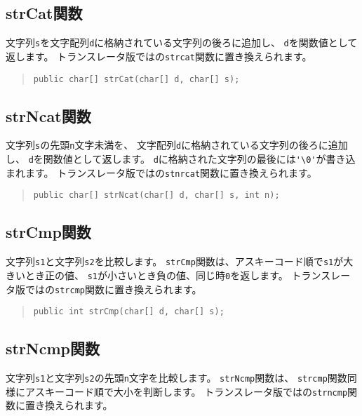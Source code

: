 \subsection{strCat関数}

文字列\verb/s/を文字配列\verb/d/に格納されている文字列の後ろに追加し、
\verb/d/を関数値として返します。
トランスレータ版では\cl の\verb/strcat/関数に置き換えられます。

\begin{quote}
\begin{verbatim}
public char[] strCat(char[] d, char[] s);
\end{verbatim}
\end{quote}

\subsection{strNcat関数}

文字列\verb/s/の先頭\verb/n/文字未満を、
文字配列\verb/d/に格納されている文字列の後ろに追加し、
\verb/d/を関数値として返します。
\verb/d/に格納された文字列の最後には\verb/'\0'/が書き込まれます。
トランスレータ版では\cl の\verb/stnrcat/関数に置き換えられます。

\begin{quote}
\begin{verbatim}
public char[] strNcat(char[] d, char[] s, int n);
\end{verbatim}
\end{quote}

\subsection{strCmp関数}

文字列\verb/s1/と文字列\verb/s2/を比較します。
\verb/strCmp/関数は、アスキーコード順で\verb/s1/が大きいとき正の値、
\verb/s1/が小さいとき負の値、同じ時\verb/0/を返します。
トランスレータ版では\cl の\verb/strcmp/関数に置き換えられます。

\begin{quote}
\begin{verbatim}
public int strCmp(char[] d, char[] s);
\end{verbatim}
\end{quote}

\subsection{strNcmp関数}

文字列\verb/s1/と文字列\verb/s2/の先頭\verb/n/文字を比較します。
\verb/strNcmp/関数は、
\verb/strcmp/関数同様にアスキーコード順で大小を判断します。
トランスレータ版では\cl の\verb/strncmp/関数に置き換えられます。

